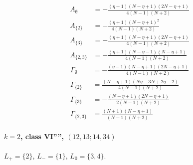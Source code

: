 \documentclass[11pt]{article}
\begin{document}
\begin{align*}
  A_{\emptyset} &= - \frac{\left(\eta - 1\right) \left(N - \eta + 1\right) \left(2 N - \eta + 1\right)}{4 \left(N - 1\right) \left(N + 2\right)} \\
  A_{\{2\}} &= - \frac{\left(\eta + 1\right) \left(N - \eta + 1\right)^{2}}{4 \left(N - 1\right) \left(N + 2\right)} \\
  A_{\{3\}} &= - \frac{\left(\eta + 1\right) \left(N - \eta + 1\right) \left(2 N - \eta + 1\right)}{4 \left(N - 1\right) \left(N + 2\right)} \\
  A_{\{2,3\}} &= - \frac{\left(\eta + 1\right) \left(N - \eta - 1\right) \left(N - \eta + 1\right)}{4 \left(N - 1\right) \left(N + 2\right)} 
\end{align*}
\begin{align*}
  \Gamma_{\emptyset} &= - \frac{\left(\eta - 1\right) \left(N - \eta + 1\right) \left(2 N - \eta + 1\right)}{4 \left(N - 1\right) \left(N + 2\right)} \\
  \Gamma_{\{2\}} &= \frac{\left(N - \eta + 1\right) \left(N \eta - 3 N + 2 \eta - 2\right)}{4 \left(N - 1\right) \left(N + 2\right)} \\
  \Gamma_{\{3\}} &= - \frac{\left(N - \eta + 1\right) \left(2 N - \eta + 1\right)}{2 \left(N - 1\right) \left(N + 2\right)} \\
  \Gamma_{\{2,3\}} &= \frac{\left(N + 1\right) \left(N - \eta + 1\right)}{\left(N - 1\right) \left(N + 2\right)} 
\end{align*}

\paragraph{$k=2$, class VI'''', $(12,13;14,34)$}

$L_+=\{2\}$, $L_-=\{1\}$, $L_0=\{3,4\}$.
\end{document}
